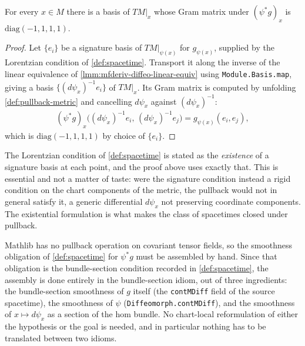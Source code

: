 \begin{lemma}
    \label{lmm:pullback-metric-lorentzian}
    \leanok
    For every $x \in M$ there is a basis of $TM|_x$ whose Gram matrix under $(\psi^*g)_x$ is $\mathrm{diag}(-1,1,1,1)$.
\end{lemma}
\begin{proof}
    \leanok
    Let $\{e_i\}$ be a signature basis of $TM|_{\psi(x)}$ for $g_{\psi(x)}$, supplied by the Lorentzian condition of \ref{def:spacetime}. Transport it along the inverse of the linear equivalence of \ref{lmm:mfderiv-diffeo-linear-equiv} using \texttt{Module.Basis.map}, giving a basis $\{(d\psi_x)^{-1}e_i\}$ of $TM|_x$. Its Gram matrix is computed by unfolding \ref{def:pullback-metric} and cancelling $d\psi_x$ against $(d\psi_x)^{-1}$:
    \begin{align}
        (\psi^*g)_x\big((d\psi_x)^{-1}e_i,\, (d\psi_x)^{-1}e_j\big) = g_{\psi(x)}(e_i, e_j),
    \end{align}
    which is $\mathrm{diag}(-1,1,1,1)$ by choice of $\{e_i\}$.
\end{proof}

The Lorentzian condition of \ref{def:spacetime} is stated as the \emph{existence} of a signature basis at each point, and the proof above uses exactly that. This is essential and not a matter of taste: were the signature condition instead a rigid condition on the chart components of the metric, the pullback would not in general satisfy it, a generic differential $d\psi_x$ not preserving coordinate components. The existential formulation is what makes the class of spacetimes closed under pullback.

Mathlib has no pullback operation on covariant tensor fields, so the smoothness obligation of \ref{def:spacetime} for $\psi^*g$ must be assembled by hand. Since that obligation is the bundle-section condition recorded in \ref{def:spacetime}, the assembly is done entirely in the bundle-section idiom, out of three ingredients: the bundle-section smoothness of $g$ itself (the \texttt{contMDiff} field of the source spacetime), the smoothness of $\psi$ (\texttt{Diffeomorph.contMDiff}), and the smoothness of $x \mapsto d\psi_x$ as a section of the hom bundle. No chart-local reformulation of either the hypothesis or the goal is needed, and in particular nothing has to be translated between two idioms.

